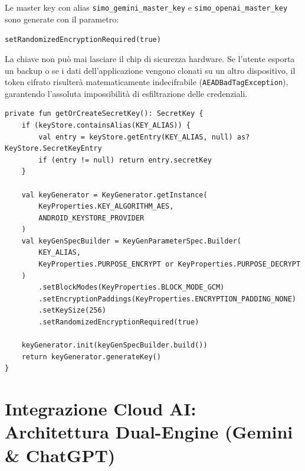 \documentclass[11pt,a4paper,titlepage]{article}
\begin{document}
\begin{secbox}
Le master key con alias \texttt{simo\_gemini\_master\_key} e \texttt{simo\_openai\_master\_key} sono generate con il parametro:
\begin{center}
\texttt{setRandomizedEncryptionRequired(true)}
\end{center}
La chiave non pu\`o mai lasciare il chip di sicurezza hardware. Se l'utente esporta un backup o se i dati dell'applicazione vengono clonati su un altro dispositivo, il token cifrato risulter\`a matematicamente indecifrabile (\texttt{AEADBadTagException}), garantendo l'assoluta impossibilit\`a di esfiltrazione delle credenziali.
\end{secbox}

\begin{lstlisting}[caption={Generazione della SecretKey hardware in CryptoUtils.kt}]
private fun getOrCreateSecretKey(): SecretKey {
    if (keyStore.containsAlias(KEY_ALIAS)) {
        val entry = keyStore.getEntry(KEY_ALIAS, null) as? KeyStore.SecretKeyEntry
        if (entry != null) return entry.secretKey
    }

    val keyGenerator = KeyGenerator.getInstance(
        KeyProperties.KEY_ALGORITHM_AES,
        ANDROID_KEYSTORE_PROVIDER
    )
    val keyGenSpecBuilder = KeyGenParameterSpec.Builder(
        KEY_ALIAS,
        KeyProperties.PURPOSE_ENCRYPT or KeyProperties.PURPOSE_DECRYPT
    )
        .setBlockModes(KeyProperties.BLOCK_MODE_GCM)
        .setEncryptionPaddings(KeyProperties.ENCRYPTION_PADDING_NONE)
        .setKeySize(256)
        .setRandomizedEncryptionRequired(true)

    keyGenerator.init(keyGenSpecBuilder.build())
    return keyGenerator.generateKey()
}
\end{lstlisting}

\section{Integrazione Cloud AI: Architettura Dual-Engine (Gemini \& ChatGPT)}
\end{document}
